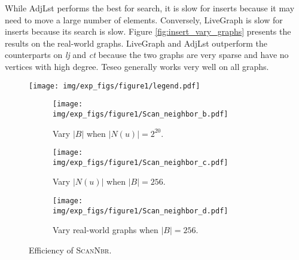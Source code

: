 While AdjLst performs the best for search, it is slow for inserts because it may need to move a large number of elements. Conversely, LiveGraph is slow for inserts because its search is slow.  Figure \ref{fig:insert_vary_graphs} presents the results on the real-world graphs. LiveGraph and AdjLst outperform the counterparts on \emph{lj} and \emph{ct} because the two graphs are very sparse and have no vertices with high degree. Teseo generally works very well on all graphs.



\begin{figure}[h!]
	\setlength{\abovecaptionskip}{0pt}
	\setlength{\belowcaptionskip}{0pt}
		\captionsetup[subfigure]{aboveskip=0pt,belowskip=0pt}
	\centering
    \texttt{[image: img/exp\_figs/figure1/legend.pdf]}\\
	\begin{subfigure}[t]{0.30\textwidth}
		\centering
		\texttt{[image: img/exp\_figs/figure1/Scan\_neighbor\_b.pdf]}
		\caption{Vary $|B|$ when $|N(u)| = 2 ^ {20}$.}
		\label{fig:scan_vary_block_size}
	\end{subfigure}
        \begin{subfigure}[t]{0.30\textwidth}
		\centering
		\texttt{[image: img/exp\_figs/figure1/Scan\_neighbor\_c.pdf]}
		\caption{Vary $|N(u)|$ when $|B| = 256$.}
		\label{fig:scan_vary_neighbor_set_size}
	\end{subfigure}
        \begin{subfigure}[t]{0.60\textwidth}
		\centering
		\texttt{[image: img/exp\_figs/figure1/Scan\_neighbor\_d.pdf]}
		\caption{Vary real-world graphs when $|B| = 256$.}
		\label{fig:scan_vary_realworld_graphs}
	\end{subfigure}
	\caption{Efficiency of \textsc{ScanNbr}.}
	\label{fig:scan}
\end{figure}



